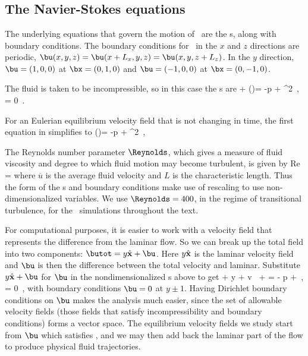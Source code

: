 
\section{{\PCf}}
\label{s:PCF}

\subsection{The Navier-Stokes equations}
\label{s:NS}
 The underlying equations
that govern the motion of \pCf\ are the {\NSe}s,
along with boundary conditions. The boundary conditions for \pCf\ in the $x$
and $z$ directions are periodic,
 $ \bu(x, y, z) = \bu(x+L_x, y, z) =
\bu(x, y, z + L_z) $.
 In the $y$ direction,
 $\bu = (1,0,0)$ at $\bx = (0,1,0)$ and $\bu = (-1,0,0)$ at $\bx =
 (0,-1,0)$.

 The fluid is taken to be incompressible, so in this case the
 {\NSe}s are
 \beq
  + (\bu \cdot \nabla)\bu = -\nabla p +  \nabla^{2} \bu
    \,,\qquad
\nabla \cdot \bu  = 0 \,. \label{eqn:NavierStokes} \eeq 



For an Eulerian equilibrium velocity field that is not changing in time, 
the first equation in  simplifies to 
\beq
 (\bu \cdot \nabla)\bu = -\nabla p +  \nabla^{2} \bu
    \,, 
 
The Reynolds number parameter $\Reynolds$, which gives a measure of fluid 
viscosity and degree to which fluid motion may become turbulent, is given 
by 
\beq Re =  
\eeq 
where $\overline{u}$ is the average fluid velocity and $L$ is the 
characteristic length. Thus the form of the {\NSe}s and boundary 
conditions make use of rescaling to use non-dimensionalized variables. We 
use $\Reynolds = 400$, in the regime of transitional turbulence, for the 
\pCf\ simulations throughout the text. 

For computational purposes, it is easier to work with a velocity field  that
represents the {difference} from the laminar flow. 
So we can break up the total field into two components: $\butot =
y \hat{\bf x} + \bu$. Here $y \hat{\bf x}$ is the laminar velocity
field and $\bu$ is then the difference between the total velocity and
laminar. Substitute $y \hat{\bf x} + \bu$ for $\bu$ in the
nondimensionalized {\NSe}s above to get
\beq
    + y  
    + v \, 
    + \bu \cdot \bnabla \bu
=
    - \bnabla p
    + 
        \lapl \bu  \,, \quad \nabla \cdot \bu = 0
\,,
with boundary conditions $\bu = 0 $ at $y \pm 1$.  Having 
Dirichlet boundary conditions on $\bu$ makes the analysis much easier, 
since the set of allowable velocity fields (those fields that satisfy 
incompressibility and boundary conditions) forms a vector space. The 
equilibrium velocity fields we study start from $\bu$ which satisfies 
, and we may then add back the laminar part of the 
flow to produce physical fluid trajectories. 

